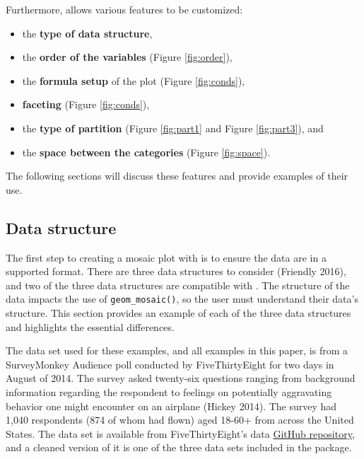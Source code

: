 Furthermore,  allows various features to be customized:

\begin{itemize}
\item
  the \textbf{type of data structure},
\item
  the \textbf{order of the variables} (Figure \ref{fig:order}),
\item
  the \textbf{formula setup} of the plot (Figure \ref{fig:conds}),
\item
  \textbf{faceting} (Figure \ref{fig:conds}),
\item
  the \textbf{type of partition} (Figure \ref{fig:part1} and Figure \ref{fig:part3}), and
\item
  the \textbf{space between the categories} (Figure \ref{fig:space}).
\end{itemize}

The following sections will discuss these features and provide examples of their use.

\hypertarget{data-structure}{%
\subsection{Data structure}\label{data-structure}}

The first step to creating a mosaic plot with  is to ensure the data are in a supported format. There are three data structures to consider (Friendly 2016), and two of the three data structures are compatible with . The structure of the data impacts the use of \texttt{geom\_mosaic()}, so the user must understand their data's structure. This section provides an example of each of the three data structures and highlights the essential differences.

The data set used for these examples, and all examples in this paper, is from a SurveyMonkey Audience poll conducted by FiveThirtyEight for two days in August of 2014. The survey asked twenty-six questions ranging from background information regarding the respondent to feelings on potentially aggravating behavior one might encounter on an airplane (Hickey 2014). The survey had 1,040 respondents (874 of whom had flown) aged 18-60+ from across the United States. The data set is available from FiveThirtyEight's data \href{https://github.com/fivethirtyeight/data/tree/master/flying-etiquette-survey}{GitHub repository}, and a cleaned version of it is one of the three data sets included in the  package.

